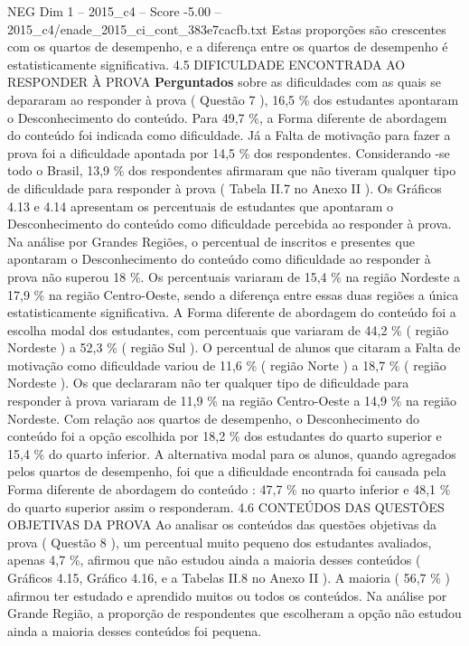 \begin{textsample}{NEG Dim 1 – 2015\_c4 – Score -5.00 – 2015\_c4/enade\_2015\_ci\_cont\_383e7cacfb.txt}
Estas proporções são crescentes com os quartos de desempenho, e a diferença entre os quartos de desempenho é estatisticamente significativa. 4.5 DIFICULDADE ENCONTRADA AO RESPONDER À PROVA \textbf{Perguntados} sobre as dificuldades com as quais se depararam ao responder à prova ( Questão 7 ), 16,5 \% dos estudantes apontaram o Desconhecimento do conteúdo.
Para 49,7 \%, a Forma diferente de abordagem do conteúdo foi indicada como dificuldade.
Já a Falta de motivação para fazer a prova foi a dificuldade apontada por 14,5 \% dos respondentes.
Considerando -se todo o Brasil, 13,9 \% dos respondentes afirmaram que não tiveram qualquer tipo de dificuldade para responder à prova ( Tabela II.7 no Anexo II ).
Os Gráficos 4.13 e 4.14 apresentam os percentuais de estudantes que apontaram o Desconhecimento do conteúdo como dificuldade percebida ao responder à prova.
Na análise por Grandes Regiões, o percentual de inscritos e presentes que apontaram o Desconhecimento do conteúdo como dificuldade ao responder à prova não superou 18 \%.
Os percentuais variaram de 15,4 \% na região Nordeste a 17,9 \% na região Centro-Oeste, sendo a diferença entre essas duas regiões a única estatisticamente significativa.
A Forma diferente de abordagem do conteúdo foi a escolha modal dos estudantes, com percentuais que variaram de 44,2 \% ( região Nordeste ) a 52,3 \% ( região Sul ).
O percentual de alunos que citaram a Falta de motivação como dificuldade variou de 11,6 \% ( região Norte ) a 18,7 \% ( região Nordeste ).
Os que declararam não ter qualquer tipo de dificuldade para responder à prova variaram de 11,9 \% na região Centro-Oeste a 14,9 \% na região Nordeste.
Com relação aos quartos de desempenho, o Desconhecimento do conteúdo foi a opção escolhida por 18,2 \% dos estudantes do quarto superior e 15,4 \% do quarto inferior.
A alternativa modal para os alunos, quando agregados pelos quartos de desempenho, foi que a dificuldade encontrada foi causada pela Forma diferente de abordagem do conteúdo : 47,7 \% no quarto inferior e 48,1 \% do quarto superior assim o responderam. 4.6 CONTEÚDOS DAS QUESTÕES OBJETIVAS DA PROVA Ao analisar os conteúdos das questões objetivas da prova ( Questão 8 ), um percentual muito pequeno dos estudantes avaliados, apenas 4,7 \%, afirmou que não estudou ainda a maioria desses conteúdos ( Gráficos 4.15, Gráfico 4.16, e a Tabelas II.8 no Anexo II ).
A maioria ( 56,7 \% ) afirmou ter estudado e aprendido muitos ou todos os conteúdos.
Na análise por Grande Região, a proporção de respondentes que escolheram a opção não estudou ainda a maioria desses conteúdos foi pequena.

\end{textsample}
